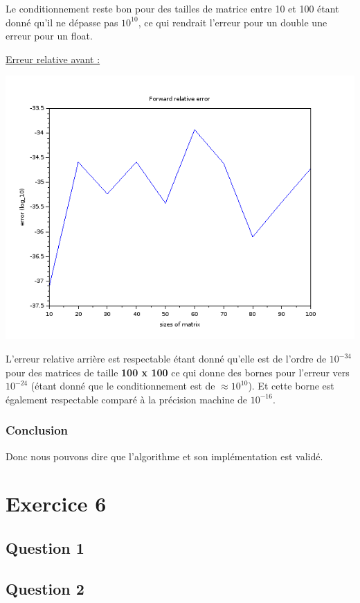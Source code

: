 \documentclass[11pt]{article}
\begin{document}
Le conditionnement reste bon pour des tailles de matrice entre 10 et
100 étant donné qu'il ne dépasse pas $10^{10}$, ce qui rendrait l'erreur
pour un double une erreur pour un float.\newline

\underline{Erreur relative avant :}

\includegraphics[scale=0.5]{img/lu_compact_error.png}

L'erreur relative arrière est respectable étant donné qu'elle est de
l'ordre de $10^{-34}$ pour des matrices de taille \textbf{100 x 100} ce
qui donne des bornes pour l'erreur vers $10^{-24}$ (étant donné
que le conditionnement est de $\approx 10^{10}$). Et cette
borne est également respectable comparé à la précision machine de
$10^{-16}$.

\subsubsection{Conclusion}

Donc nous pouvons dire que l'algorithme et son implémentation est
validé.

\section{Exercice 6}

\subsection{Question 1}

\subsection{Question 2}
\end{document}
